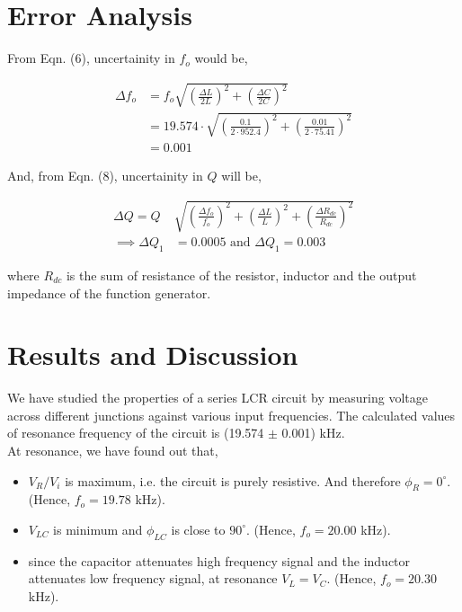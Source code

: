 \section{Error Analysis}
From Eqn. (6), uncertainity in $f_o$ would be,

\begin{align*}
    \Delta f_o &= f_o\sqrt{\left(\frac{\Delta L}{2L}\right)^2 + \left(\frac{\Delta C}{2C}\right)^2}\\
    &=19.574\cdot\sqrt{\left(\frac{0.1}{2\cdot952.4}\right)^2 + \left(\frac{0.01}{2\cdot75.41}\right)^2}\\
    &=0.001
\end{align*}

And, from Eqn. (8), uncertainity in $Q$ will be,

\begin{align*}
    \Delta Q = Q&\sqrt{\left(\frac{\Delta f_o}{f_o}\right)^2 + \left(\frac{\Delta L}{L}\right)^2 + \left(\frac{\Delta R_{dc}}{R_{dc}}\right)^2}\\
    \implies \Delta Q_1&=0.0005\text{ and }\Delta Q_1=0.003
\end{align*}

where $R_{dc}$ is the sum of resistance of the resistor, inductor and the output impedance of the function generator.

\section{Results and Discussion}
We have studied the properties of a series LCR circuit by measuring voltage across different junctions against various input frequencies. The calculated values of resonance frequency of the circuit is (19.574 $\pm$ 0.001) kHz.\\

At resonance, we have found out that,

\begin{itemize}
    \item $V_R/V_i$ is maximum, i.e. the circuit is purely resistive. And therefore $\phi_R=0^{\circ}$. (Hence, $f_o=19.78$ kHz).
    \item $V_{LC}$ is minimum and $\phi_{LC}$ is close to $90^{\circ}$. (Hence, $f_o=20.00$ kHz).
    \item since the capacitor attenuates high frequency signal and the inductor attenuates low frequency signal, at resonance $V_L = V_C$. (Hence, $f_o=20.30$ kHz).\\
\end{itemize}

